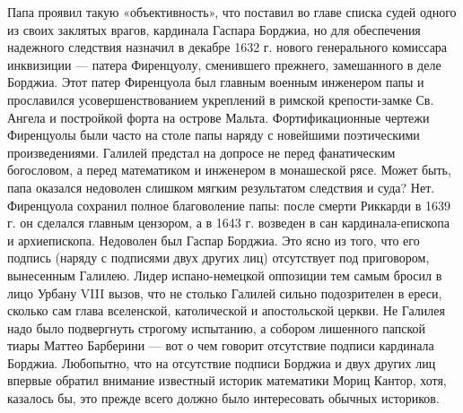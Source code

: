 Папа проявил такую «объективность», что поставил во главе списка судей
одного из  своих заклятых  врагов, кардинала  Гаспара Борджиа,  но для
обеспечения  надежного следствия  назначил  в декабре  1632 г.  нового
генерального  комиссара инквизиции  --- патера  Фиренцуолу, сменившего
прежнего,  замешанного  в  деле  Борджиа. Этот  патер  Фиренцуола  был
главным  военным  инженером  папы  и  прославился  усовершенствованием
укреплений в римской  крепости-замке Св. Ангела и  постройкой форта на
острове  Мальта. Фортификационные  чертежи  Фиренцуолы  были часто  на
столе  папы наряду  с новейшими  поэтическими произведениями.  Галилей
предстал  на  допросе  не   перед  фанатическим  богословом,  а  перед
математиком и инженером  в монашеской рясе. Может  быть, папа оказался
недоволен слишком мягким результатом следствия и суда? Нет. Фиренцуола
сохранил  полное  благоволение  папы:  после смерти  Риккарди  в  1639
г.  он  сделался  главным  цензором,  а  в  1643  г.  возведен  в  сан
кардинала-епископа и  архиепископа. Недоволен был Гаспар  Борджиа. Это
ясно из  того, что его  подпись (наряду  с подписями двух  других лиц)
отсутствует под приговором,  вынесенным Галилею. Лидер испано-немецкой
оппозиции тем  самым бросил в лицо  Урбану VIII вызов, что  не столько
Галилей  сильно подозрителен  в ереси,  сколько сам  глава вселенской,
католической и  апостольской церкви. Не Галилея  надо было подвергнуть
строгому испытанию, а собором лишенного папской тиары Маттео Барберини
--- вот о чем говорит отсутствие подписи кардинала Борджиа. Любопытно,
что на  отсутствие подписи Борджиа  и двух других лиц  впервые обратил
внимание известный историк математики Мориц Кантор, хотя, казалось бы,
это прежде всего должно было интересовать обычных историков.

